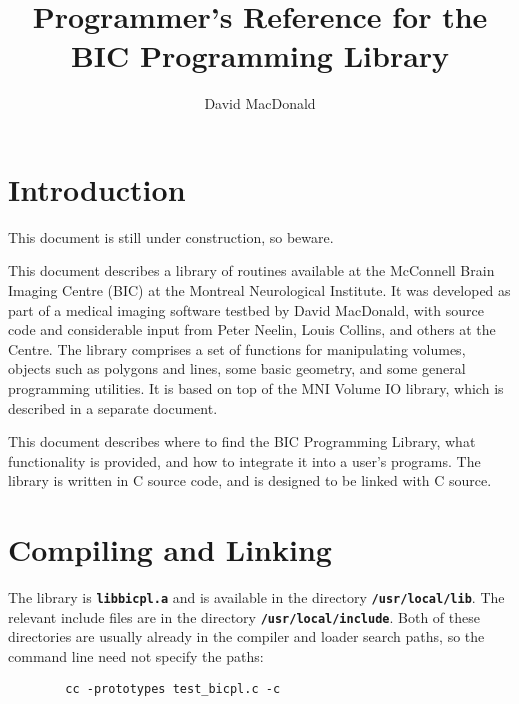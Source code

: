 
\title{Programmer's Reference for the
BIC Programming Library}

\author{David MacDonald}

\newcommand{\name}[1]{{\bf\tt #1}}

\newcommand{\desc}[1]{\begin{itemize}
\item[] #1
\end{itemize}}

\newcommand{\bicpl}{BIC Programming Library}



\maketitle

\newpage

\tableofcontents

\newpage

\chapter{Introduction}

This document is still under construction, so beware.

This document describes a library of routines available at the
McConnell Brain Imaging Centre (BIC) at the Montreal Neurological Institute.
It was developed as part of a medical imaging software testbed by
David MacDonald, with source code and considerable input from Peter
Neelin, Louis Collins, and others at the Centre.
The library comprises a set of functions for manipulating volumes,
objects such as polygons and lines, some basic geometry, and some general
programming utilities.  It is
based on top of the MNI Volume IO library, which is described in a
separate document.

This document describes where to find the \bicpl,
what functionality is provided, and
how to integrate it into a user's programs.
The library is written in C source code, and is designed
to be linked with C source.

\chapter{Compiling and Linking}

The library is \name{libbicpl.a} and is available in the directory
\name{/usr/local/lib}.  The relevant include files are in the
directory \name{/usr/local/include}.  Both of these directories are
usually already in the compiler and loader search paths, so the
command line need not specify the paths:
{\bf\begin{verbatim}
        cc -prototypes test_bicpl.c -c
\end{verbatim}}

